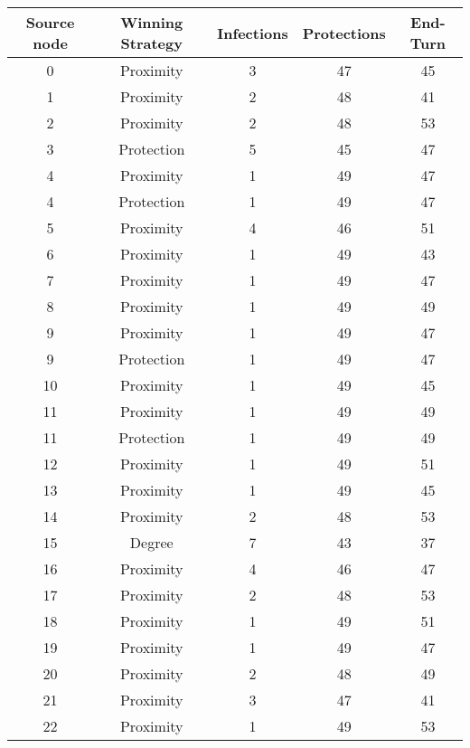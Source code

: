 \documentclass[results.tex]{subfiles}
\begin{document}
\begin{center}
  \begin{tabular}{| c || c | c | c | c |}
    \hline
    {\bfseries Source node} & {\bfseries Winning Strategy} & {\bfseries Infections} & {\bfseries Protections} & {\bfseries End-Turn} \\  %
    \hline\hline
    0 & Proximity & 3 & 47 & 45 \\ 
    \hline
    1 & Proximity & 2 & 48 & 41 \\ 
    \hline
    2 & Proximity & 2 & 48 & 53 \\ 
    \hline
    3 & Protection & 5 & 45 & 47 \\ 
    \hline
    4 & Proximity & 1 & 49 & 47 \\ 
    \hline
    4 & Protection & 1 & 49 & 47 \\ 
    \hline
    5 & Proximity & 4 & 46 & 51 \\ 
    \hline
    6 & Proximity & 1 & 49 & 43 \\ 
    \hline
    7 & Proximity & 1 & 49 & 47 \\ 
    \hline
    8 & Proximity & 1 & 49 & 49 \\ 
    \hline
    9 & Proximity & 1 & 49 & 47 \\ 
    \hline
    9 & Protection & 1 & 49 & 47 \\ 
    \hline
    10 & Proximity & 1 & 49 & 45 \\ 
    \hline
    11 & Proximity & 1 & 49 & 49 \\ 
    \hline
    11 & Protection & 1 & 49 & 49 \\ 
    \hline
    12 & Proximity & 1 & 49 & 51 \\ 
    \hline
    13 & Proximity & 1 & 49 & 45 \\ 
    \hline
    14 & Proximity & 2 & 48 & 53 \\ 
    \hline
    15 & Degree & 7 & 43 & 37 \\ 
    \hline
    16 & Proximity & 4 & 46 & 47 \\ 
    \hline
    17 & Proximity & 2 & 48 & 53 \\ 
    \hline
    18 & Proximity & 1 & 49 & 51 \\ 
    \hline
    19 & Proximity & 1 & 49 & 47 \\ 
    \hline
    20 & Proximity & 2 & 48 & 49 \\ 
    \hline
    21 & Proximity & 3 & 47 & 41 \\ 
    \hline
    22 & Proximity & 1 & 49 & 53 \\ 

\end{tabular}
\end{center}
\end{document}
